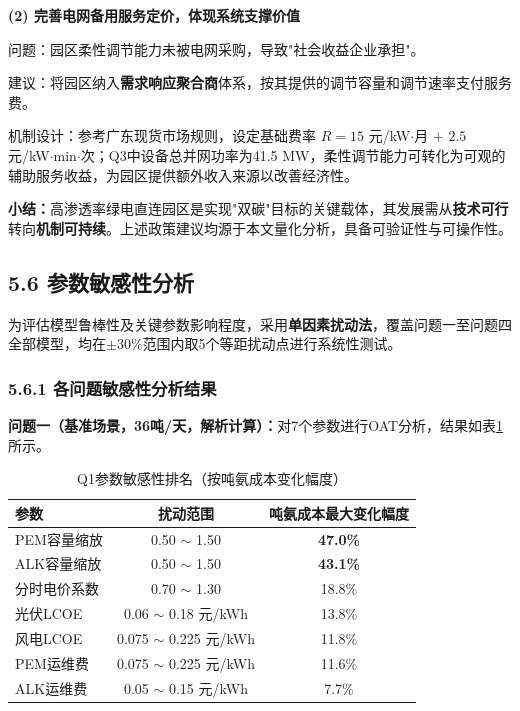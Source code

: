 \documentclass[zihao=-4,a4paper]{ctexart} %
\begin{document}
	\textbf{(2) 完善电网备用服务定价，体现系统支撑价值}
	
	\par\quad 问题：园区柔性调节能力未被电网采购，导致"社会收益企业承担"。
	
	\par\quad 建议：将园区纳入\textbf{需求响应聚合商}体系，按其提供的调节容量和调节速率支付服务费。
	
	\par\quad 机制设计：参考广东现货市场规则，设定基础费率 $R = 15$ 元/kW$\cdot$月 $+$ $2.5$ 元/kW$\cdot$min$\cdot$次；Q3中设备总并网功率为41.5 MW，柔性调节能力可转化为可观的辅助服务收益，为园区提供额外收入来源以改善经济性。
	
	\vspace{0.5em}
	\noindent\textbf{小结：}高渗透率绿电直连园区是实现"双碳"目标的关键载体，其发展需从\textbf{技术可行}转向\textbf{机制可持续}。上述政策建议均源于本文量化分析，具备可验证性与可操作性。
	
	\subsection*{5.6 参数敏感性分析}
	
	为评估模型鲁棒性及关键参数影响程度，采用\textbf{单因素扰动法}，覆盖问题一至问题四全部模型，均在$\pm30\%$范围内取5个等距扰动点进行系统性测试。
	
	\subsubsection*{5.6.1 各问题敏感性分析结果}
	
	\textbf{问题一（基准场景，36吨/天，解析计算）：}对7个参数进行OAT分析，结果如表\ref{tab:q6_q1}所示。
	
	\begin{table}[ht]
		\centering
		\small
		\caption{Q1参数敏感性排名（按吨氨成本变化幅度）}
		\label{tab:q6_q1}
		\begin{tabular}{lcc}
			\toprule
			参数 & 扰动范围 & 吨氨成本最大变化幅度 \\
			\midrule
			PEM容量缩放 & 0.50 $\sim$ 1.50 & \textbf{47.0\%} \\
			ALK容量缩放 & 0.50 $\sim$ 1.50 & \textbf{43.1\%} \\
			分时电价系数 & 0.70 $\sim$ 1.30 & 18.8\% \\
			光伏LCOE & 0.06 $\sim$ 0.18 元/kWh & 13.8\% \\
			风电LCOE & 0.075 $\sim$ 0.225 元/kWh & 11.8\% \\
			PEM运维费 & 0.075 $\sim$ 0.225 元/kWh & 11.6\% \\
			ALK运维费 & 0.05 $\sim$ 0.15 元/kWh & 7.7\% \\
			\bottomrule
		\end{tabular}
	\end{table}
	
\end{document}
